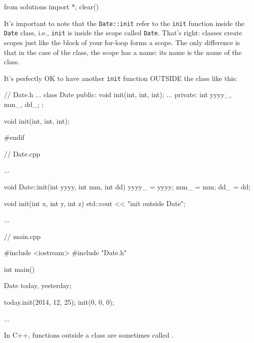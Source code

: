 \begin{python0}
from solutions import *; clear()
\end{python0}

It's important to note that the \texttt{Date::init} refer
to the \texttt{init} function inside the \texttt{Date} class, i.e.,
\texttt{init} is inside the scope called \texttt{Date}.
That's right: classes create scopes just like the block
of your for-loop forms a scope. The only difference is that in the case
of the class, the scope has a name: its name is the name of the class.

It's perfectly OK to have another \texttt{init} function
OUTSIDE the class like this:

\begin{consolethree}[escapeinside=||]
// Date.h
...
class Date
{
public:
    void init(int, int, int);
    ...
private:
    int yyyy_, mm_, dd_;
};

void init(int, int, int);

#endif
\end{consolethree}

\begin{consolethree}[escapeinside=||]
// Date.cpp

...

void Date::init(int yyyy, int mm, int dd)
{
    yyyy_ = yyyy;
    mm_ = mm;
    dd_ = dd;
}

void init(int x, int y, int z)
{
    std::cout << "init outside Date\n";
}

...
\end{consolethree}

\begin{consolethree}[escapeinside=||]
// main.cpp

#include <iostream>
#include "Date.h"

int main()
{
    Date today, yesterday;

    today.init(2014, 12, 25);
    init(0, 0, 0);

    ...
}
\end{consolethree}

In C++, functions outside a class are sometimes called .



